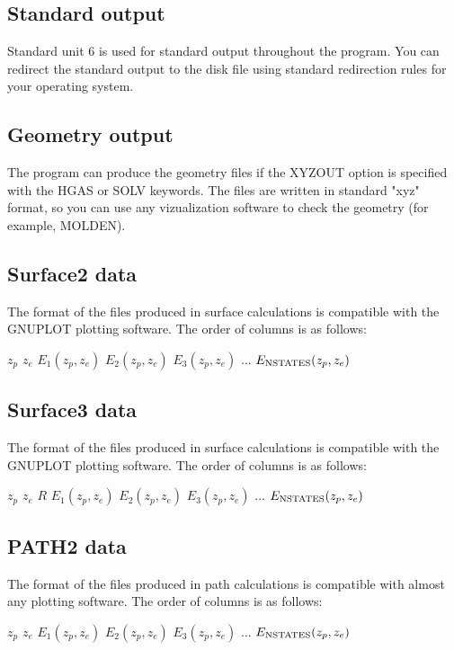 \documentclass[oneside,11pt,openany]{book}
\newcommand{\tw}{\ttfamily}
\begin{document}
\subsection{Standard output}
Standard unit 6 is used for standard output throughout the program.
You can redirect the standard output to the disk file using standard
redirection rules for your operating system.

\subsection{Geometry output}
The program can produce the geometry files if the {\tw XYZOUT} option
is specified with the {\tw HGAS} or {\tw SOLV} keywords. The files are
written in standard "xyz" format, so you can use any vizualization
software to check the geometry (for example, MOLDEN).

\subsection{Surface2 data}
The format of the files produced in surface calculations is
compatible with the {\tw GNUPLOT} plotting software. The order
of columns is as follows:

\begin{description}
\item $z_p$ $z_e$ $E_1(z_p,z_e)$ $E_2(z_p,z_e)$ $E_3(z_p,z_e)$ ...
$E_{\rm NSTATES}(z_p,z_e)$
\end{description}

\subsection{Surface3 data}
The format of the files produced in surface calculations is
compatible with the {\tw GNUPLOT} plotting software. The order
of columns is as follows:

\begin{description}
\item $z_p$ $z_e$ $R$ $E_1(z_p,z_e)$ $E_2(z_p,z_e)$ $E_3(z_p,z_e)$ ...
$E_{\rm NSTATES}(z_p,z_e)$
\end{description}

\subsection{PATH2 data}
The format of the files produced in path calculations is
compatible with almost any plotting software. The order
of columns is as follows:
\begin{description}
\item $z_p$ $z_e$ $E_1(z_p,z_e)$ $E_2(z_p,z_e)$ $E_3(z_p,z_e)$ ...
$E_{\rm NSTATES}(z_p,z_e)$
\end{description}
\end{document}
